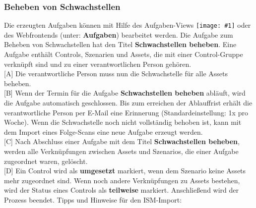 \documentclass[a4paper,10pt]{book}
\newcommand{\icon}[1]{\texttt{[image: \#1]}}
\begin{document}
\subsubsection{Beheben von Schwachstellen}
Die erzeugten Aufgaben können mit Hilfe des Aufgaben-Views \icon{Icon/Tasks.png} oder des Webfrontends
(unter: \textbf{Aufgaben}) bearbeitet werden. Die Aufgabe zum Beheben von Schwachstellen hat den Titel \textbf{Schwachstellen beheben}. Eine Aufgabe enthält Controls, Szenarien und Assets, die mit einer Control-Gruppe verknüpft sind und zu einer verantwortlichen Person gehören.
\newline\\
{[}A{]} Die verantwortliche Person muss nun die Schwachstelle für alle Assets beheben.
\newline\\
{[}B{]} Wenn der Termin für die Aufgabe \textbf{Schwachstellen beheben} abläuft, wird die Aufgabe automatisch geschlossen. Bis zum erreichen der Ablauffrist
erhält die verantwortliche Person per E-Mail eine Erinnerung (Standardeinstellung: 1x pro Woche). Wenn die Schwachstelle noch nicht vollständig behoben ist, kann mit dem Import eines Folge-Scans eine neue Aufgabe erzeugt werden.
\newline\\
{[}C{]} Nach Abschluss einer Aufgabe mit dem Titel \textbf{Schwachstellen beheben}, werden alle Verknüpfungen zwischen
Assets und Szenarios, die einer Aufgabe zugeordnet waren, gelöscht.
\newline\\
{[}D{]} Ein Control wird als \textbf{umgesetzt} markiert, wenn dem Szenario keine Assets mehr zugeordnet sind. Wenn noch andere Verknüpfungen zu Assets bestehen, wird
der Status eines Controls als \textbf{teilweise} markiert. Anschließend wird der Prozess beendet.
Tipps und Hinweise für den ISM-Import:
\end{document}
